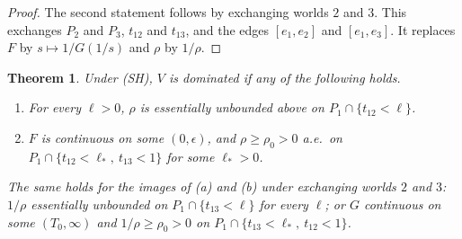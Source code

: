 \documentclass[11pt]{article}
\newtheorem{theorem}{Theorem}
\theoremstyle{definition}\newtheorem{definition}[theorem]{Definition}
\theoremstyle{remark}\newtheorem{remark}[theorem]{Remark}
\begin{document}
\begin{proof}
The second statement follows by exchanging worlds $2$ and $3$. This exchanges
$P_2$ and $P_3$, $t_{12}$ and $t_{13}$, and the edges $[e_1,e_2]$ and
$[e_1,e_3]$. It replaces $F$ by $s\mapsto1/G(1/s)$ and $\rho$ by $1/\rho$.
\end{proof}

\begin{theorem}\label{thm:U}
Under (SH), $V$ is dominated if any of the following holds.
\begin{enumerate}[label=(\alph*)]
\item For every $\ell>0$, $\rho$ is essentially unbounded above on
$P_1\cap\{t_{12}<\ell\}$.
\item $F$ is continuous on some $(0,\epsilon)$, and $\rho\ge\rho_0>0$ a.e.\
on $P_1\cap\{t_{12}<\ell_*,\ t_{13}<1\}$ for some $\ell_*>0$.
\end{enumerate}
The same holds for the images of (a) and (b) under exchanging worlds $2$
and $3$: $1/\rho$ essentially unbounded on $P_1\cap\{t_{13}<\ell\}$ for every
$\ell$; or $G$ continuous on some $(T_0,\infty)$ and $1/\rho\ge\rho_0>0$ on
$P_1\cap\{t_{13}<\ell_*,\ t_{12}<1\}$.
\end{theorem}
\end{document}

